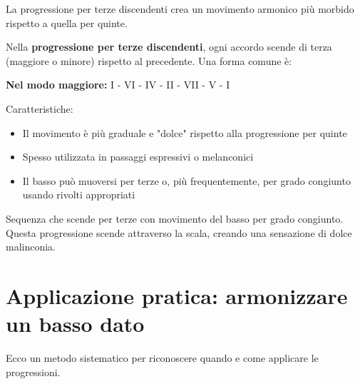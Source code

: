 La progressione per terze discendenti crea un movimento armonico più morbido rispetto a quella per quinte.

\begin{regola}
	\label{reg:progressione_terze_disc}
	Nella \textbf{progressione per terze discendenti}, ogni accordo scende di terza (maggiore o minore) rispetto al precedente. Una forma comune è:
	
	\textbf{Nel modo maggiore:}
	I - VI - IV - II - VII - V - I
	
	Caratteristiche:
	\begin{itemize}
		\item Il movimento è più graduale e "dolce" rispetto alla progressione per quinte
		\item Spesso utilizzata in passaggi espressivi o melanconici
		\item Il basso può muoversi per terze o, più frequentemente, per grado congiunto usando rivolti appropriati
	\end{itemize}
\end{regola}

\begin{esempio}
	\label{ex:progressione_terze_disc}
	Sequenza che scende per terze con movimento del basso per grado congiunto.
	Questa progressione scende attraverso la scala, creando una sensazione di dolce malinconia.
\end{esempio}

\section{Applicazione pratica: armonizzare un basso dato}
\label{sec:applicazione_basso_dato}

Ecco un metodo sistematico per riconoscere quando e come applicare le progressioni.

